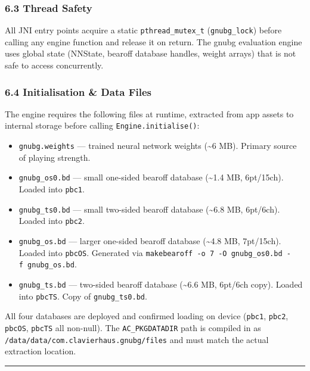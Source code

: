 \documentclass[11pt,a4paper]{article}
\providecommand{\tightlist}{\setlength{\itemsep}{2pt}\setlength{\parskip}{0pt}}
\begin{document}
\subsubsection{6.3 Thread Safety}\label{thread-safety}

All JNI entry points acquire a static \texttt{pthread\_mutex\_t}
(\texttt{gnubg\_lock}) before calling any engine function and release it
on return. The gnubg evaluation engine uses global state (NNState,
bearoff database handles, weight arrays) that is not safe to access
concurrently.

\subsubsection{6.4 Initialisation \& Data
Files}\label{initialisation-data-files}

The engine requires the following files at runtime, extracted from app
assets to internal storage before calling \texttt{Engine.initialise()}:

\begin{itemize}
\tightlist
\item
  \texttt{gnubg.weights} --- trained neural network weights
  (\textasciitilde6 MB). Primary source of playing strength.
\item
  \texttt{gnubg\_os0.bd} --- small one-sided bearoff database
  (\textasciitilde1.4 MB, 6pt/15ch). Loaded into \texttt{pbc1}.
\item
  \texttt{gnubg\_ts0.bd} --- small two-sided bearoff database
  (\textasciitilde6.8 MB, 6pt/6ch). Loaded into \texttt{pbc2}.
\item
  \texttt{gnubg\_os.bd} --- larger one-sided bearoff database
  (\textasciitilde4.8 MB, 7pt/15ch). Loaded into \texttt{pbcOS}.
  Generated via
  \texttt{makebearoff\ -o\ 7\ -O\ gnubg\_os0.bd\ -f\ gnubg\_os.bd}.
\item
  \texttt{gnubg\_ts.bd} --- two-sided bearoff database
  (\textasciitilde6.6 MB, 6pt/6ch copy). Loaded into \texttt{pbcTS}.
  Copy of \texttt{gnubg\_ts0.bd}.
\end{itemize}

All four databases are deployed and confirmed loading on device
(\texttt{pbc1}, \texttt{pbc2}, \texttt{pbcOS}, \texttt{pbcTS} all
non-null). The \texttt{AC\_PKGDATADIR} path is compiled in as
\texttt{/data/data/com.clavierhaus.gnubg/files} and must match the
actual extraction location.

\begin{center}\rule{0.5\linewidth}{0.5pt}\end{center}
\end{document}
